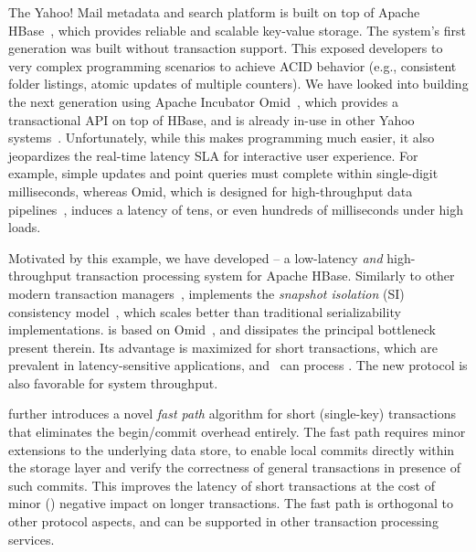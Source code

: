 The Yahoo! Mail metadata and search platform is built on top of Apache HBase~\cite{hbase}, 
which provides reliable and scalable key-value storage. The system's first generation
was built without transaction support. This exposed  developers to very complex programming scenarios 
to achieve ACID behavior (e.g., consistent folder listings, atomic updates of multiple counters). 
We have looked into building the next generation using 
 Apache Incubator Omid~\cite{omid}, which provides a transactional API on top of HBase, and 
 is already in-use in other Yahoo systems~\cite{omid-blog}.
Unfortunately, while this makes programming much easier, it also jeopardizes 
the real-time latency SLA for interactive user experience. For example,  
simple updates and point queries must complete within single-digit milliseconds, 
whereas Omid, which is designed for high-throughput data pipelines~\cite{Omid2017}, 
induces a latency of tens, or even hundreds of milliseconds under high loads. 

Motivated by this example, we have developed {\sys\/} -- a low-latency {\em and\/} high-throughput 
transaction processing system for Apache HBase. Similarly to other modern transaction managers~\cite{cockroach,Spanner2012,Percolator2010,Omid2017},
{\sys\/} implements the {\em snapshot isolation} (SI) consistency model~\cite{DBLP:conf/sigmod/BerensonBGMOO95},
which scales better than traditional serializability implementations. {\sys\/} is based on Omid~\cite{omid}, 
and dissipates the principal bottleneck present therein.
Its advantage is maximized for short  transactions, which are prevalent in latency-sensitive applications,
and \sys\ can process . The new protocol is also favorable for system throughput. 

{\sys\/} further introduces a novel {\em fast path\/} algorithm for short (single-key) transactions 
that eliminates the begin/commit overhead entirely. The fast path requires minor extensions to the underlying 
data store, to enable local commits directly within the storage layer and verify the correctness of general 
transactions in presence of such commits. This improves the latency of short transactions 
 at the cost of minor () negative impact on longer transactions. 
The fast path is orthogonal to other protocol aspects, and can be  supported in other 
transaction processing services.

